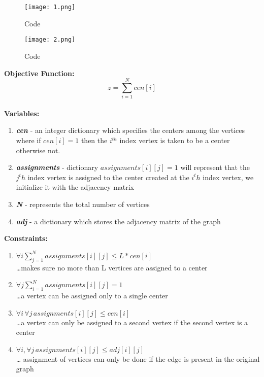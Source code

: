 \documentclass[12pt,a4paper,onecolumn]{article}
\begin{document}
\begin{center}

\begin{figure}[H]
 \texttt{[image: 1.png]}
  \caption{Code}
  \label{Figure 2}
\end{figure}

\begin{figure}[H]
 \texttt{[image: 2.png]}
  \caption{Code}
  \label{Figure 3}
\end{figure}
\end{center}
\textbf{Objective Function:}\\
\hspace{15mm} $$z=\sum_{i=1}^{N}cen[i]$$
\\
\textbf{Variables:}\begin{enumerate}
\item \textit{\textbf{cen}} - an integer dictionary which specifies the centers among the vertices
where if $cen[i]=1$ then the $i^{th}$ index vertex is taken to be a center otherwise not.\item \textit{\textbf{assignments}} - dictionary $assignments[i][j]=1$ will represent that the $j^th$ index vertex is assigned to the center created at the $i^th$ index vertex, we initialize it with the adjacency matrix
\item \textit{\textbf{N}} - represents the total number of vertices
\item \textit{\textbf{adj}} - a dictionary which stores the adjacency matrix of the graph 
\end{enumerate}
\textbf{Constraints:}
\begin{enumerate}
\item $\forall i \sum_{j=1}^{N}assignments[i][j]\leq L*cen[i]$\\\hspace{1cm}\ldots makes sure no more than L vertices are assigned to a center
\item $\forall j \sum_{i=1}^{N}assignments[i][j] = 1$\\\hspace{1cm}\ldots a vertex can be assigned only to a single center
\item $\forall i \, \forall j \, assignments[i][j] \leq cen[i]$\\\hspace{1cm}\ldots a vertex can only be assigned to a second vertex if the second vertex is a center
\item $\forall i , \forall j \, assignments[i][j] \leq adj[i][j]$\\\hspace{1cm}\ldots 
assignment of vertices can only be done if the edge is present in the original graph

\end{enumerate}
\end{document}
